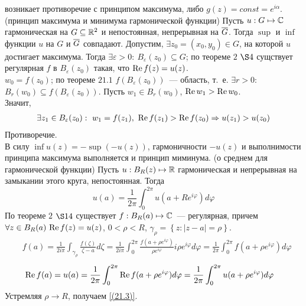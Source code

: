 возникает противоречие с принципом максимума, либо $g(z) = const = e^{i
  \alpha}$.
\theorem (принцип максимума и минимума гармонической функции)
Пусть $u: G \mapsto \mathbb{C}$ гармоническая на $G \subseteq \mathbb{R}^2$ и непостоянная,
непрерывная на $\overline{G}$. Тогда $\sup$ и $\inf$ функции $u$ на $G$ и $\overline{G}$
совпадают.
\pr
Допустим, $\exists z_0 = (x_0, y_0)\in G$, на которой $u$ достигает максимума.
Тогда $\exists \varepsilon > 0: \ B_\varepsilon(z_0)\subseteq G$; по теореме $2$
$\S 4$ сущствует регулярная $f$ в $B_\varepsilon(z_0)$ такая, что $\mathrm{Re}\, f(z) =
u(z)$.
\\
$w_0 = f(z_0)$; по теореме $21.1$ $f(B_\varepsilon(z_0))$~--- область, т.~е.
$\exists r > 0$: $B_r(w_0) \subseteq f(B_{\varepsilon}(z_0))$. Пусть $w_1 \in
B_r(w_0)$, $\mathrm{Re}\, w_1 > \mathrm{Re}\, w_0$.
\\
Значит,
\begin{align*}
  \exists z_1 \in B_\varepsilon(z_0): \ w_1 = f(z_1), \ \mathrm{Re}\, f(z_1) > \mathrm{Re}\, f(z_0) \Rightarrow u(z_1)>u(z_0)
\end{align*}
Противоречие.
\\
В силу $\inf u(z) = - \sup(-u(z))$, гармоничности $-u(z)$ и выполнимости
принципа максимума выполняется и принцип миминума.
\theorem (о среднем для гармонической функции)
Пусть $u: B_R(z) \mapsto \mathbb{R}$ гармоническая и непрерывная на замыкании
этого круга, непостоянная. Тогда
\begin{equation}\label{(21.3)}
    u(a) = \frac{1}{2\pi}\int_0^{2\pi}u(a+Re^{i\varphi})d\varphi
\end{equation}
\pr
По теореме $2$ $\S 14$ существует $f: B_R(a) \mapsto \mathbb{C}$~--- регулярная, причем
$\forall z \in B_R(a) \ \mathrm{Re}\, f(z) = u(z)$, $0<\rho < R$, $\gamma_\rho =
\left\{ z: \left| z-a \right| = \rho\right\}$.
\begin{align*}
  & f(a) = \frac{1}{2 i \pi}\int_{\gamma_\rho}\frac{f(\zeta)}{\zeta - a}d\zeta = \frac{1}{2i\pi}\int_0^{2\pi}\frac{f(a+\rho e^{i\varphi})}{\rho e^{i\varphi}} i \rho e^{i\varphi} d \varphi = \frac{1}{2\pi}\int_0^{2\pi}f(a+\rho e^{i\varphi})d \varphi
\end{align*}
\begin{align*}
  & \mathrm{Re}\, f(a) = u(a) = \frac{1}{2\pi}\int_0^{2\pi}\mathrm{Re}\, f(a+\rho e^{i\varphi})d \varphi = \frac{1}{2\pi}\int_0^{2\pi}u (a+\rho e^{i\varphi})d \varphi
\end{align*}
Устремляя $\rho \to R$, получаем \eqref{(21.3)}.
